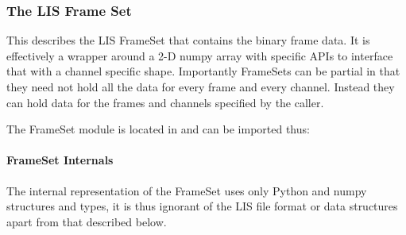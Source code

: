 \documentclass[letterpaper,10pt,english]{sphinxmanual}
\begin{document}
\subsubsection{The LIS Frame Set}
\label{\detokenize{ref/LIS/core/FrameSet:the-lis-frame-set}}\label{\detokenize{ref/LIS/core/FrameSet::doc}}
This describes the LIS FrameSet that contains the binary frame data. It is effectively a wrapper around a 2-D numpy array with specific APIs to interface that with a channel specific shape. Importantly FrameSets can be partial in that they need not hold all the data for every frame and every channel. Instead they can hold data for the frames and channels specified by the caller.

The FrameSet module is located in  and can be imported thus:

\begin{sphinxVerbatim}[commandchars=\\\{\}]
   
\end{sphinxVerbatim}


\paragraph{FrameSet Internals}
\label{\detokenize{ref/LIS/core/FrameSet:frameset-internals}}
The internal representation of the FrameSet uses only Python and numpy structures and types, it is thus ignorant of the LIS file format or data structures apart from that described below.
\end{document}
